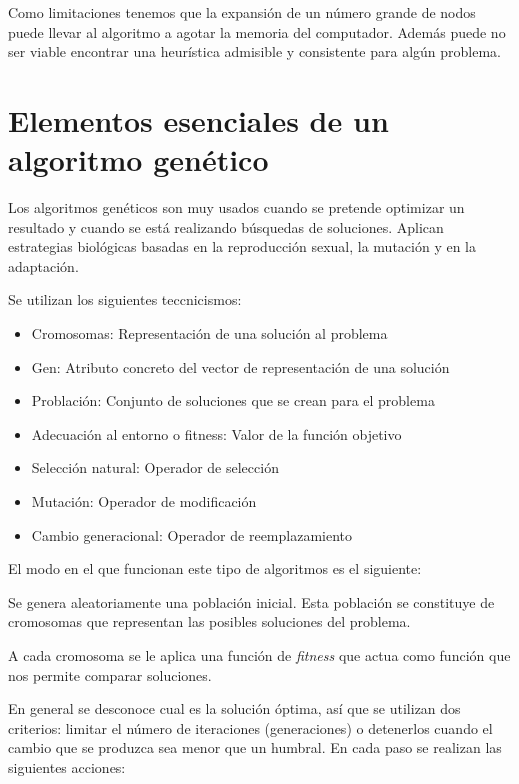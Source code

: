 \documentclass[12pt]{article}
\begin{document}
Como limitaciones tenemos que la expansión de un número grande de
nodos puede llevar al algoritmo a agotar la memoria del
computador. Además puede no ser viable encontrar una heurística
admisible y consistente para algún problema.

\section{Elementos esenciales de un algoritmo genético}

Los algoritmos genéticos son muy usados cuando se pretende optimizar
un resultado y cuando se está realizando búsquedas de
soluciones. Aplican estrategias biológicas basadas en la reproducción
sexual, la mutación y en la adaptación.

Se utilizan los siguientes teccnicismos:

\begin{itemize}
\item Cromosomas: Representación de una solución al problema
\item Gen: Atributo concreto del vector de representación de una solución
\item Problación: Conjunto de soluciones que se crean para el problema
\item Adecuación al entorno o fitness: Valor de la función objetivo
\item Selección natural: Operador de selección
\item Mutación: Operador de modificación
\item Cambio generacional: Operador de reemplazamiento
\end{itemize}

El modo en el que funcionan este tipo de algoritmos es el siguiente:

Se genera aleatoriamente una población inicial. Esta población se
constituye de cromosomas que representan las posibles soluciones del
problema.

A cada cromosoma se le aplica una función de \textit{fitness} que
actua como función que nos permite comparar soluciones.

En general se desconoce cual es la solución óptima, así que se
utilizan dos criterios: limitar el número de iteraciones
(generaciones) o detenerlos cuando el cambio que se produzca sea menor
que un humbral. En cada paso se realizan las siguientes acciones:
\end{document}
